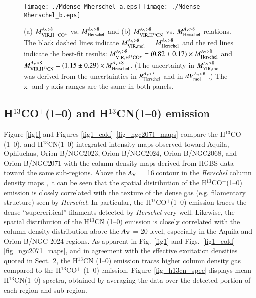 \documentclass{aa}
\begin{document}
\begin{figure}
\begin{center}
\texttt{[image: ./Mdense-Mherschel\_a.eps]} 
\texttt{[image: ./Mdense-Mherschel\_b.eps]} 
\caption{(a) $M_{\rm VIR,H^{13}CO^+}^{A_{\rm V}>8}$ vs. $M_{\rm Herschel}^{A_{\rm V}>8}$ and (b) $M_{\rm VIR,H^{13}CN}^{A_{\rm V}>8}$ vs. $M_{\rm Herschel}^{A_{\rm V}>8}$ relations. The black dashed lines indicate $M_{\rm VIR,mol}^{A_{\rm V}>8}$ = $M_{\rm Herschel}^{A_{\rm V}>8}$ and 
the red lines indicate the best-fit results: 
$M_{\rm VIR,H^{13}CO^+}^{A_{\rm V}>8} = (0.82\pm0.17) \times M_{\rm Herschel}^{A_{\rm V}>8}$ 
and $M_{\rm VIR,H^{13}CN}^{A_{\rm V}>8} = (1.15\pm0.29) \times M_{\rm Herschel}^{A_{\rm V}>8}$. 
(The uncertainty in $M_{\rm VIR,mol}^{A_{\rm V}>8}$ was derived from the uncertainties in $R_{\rm Herschel}^{A_{\rm V}>8}$ and in $dV_{\rm mol}^{A_{\rm V}>8}$ \citep[see][]{Ikeda07, Shimajiri15a}.) {The x- and y-axis ranges are the same in both panels.}}
\label{Fig-Mvir_Mherschel}
\end{center}
\end{figure}





\subsection{H$^{13}$CO$^+$(1--0) and H$^{13}$CN(1--0) emission}

Figure \ref{fig1} and Figures \ref{fig1_cold}--\ref{fig_ngc2071_maps} 
compare  the H$^{13}$CO$^+$(1--0), and H$^{13}$CN(1--0) integrated intensity maps 
observed toward Aquila, Ophiuchus, Orion B/NGC2023, Orion B/NGC2024, Orion B/NGC2068, and Orion B/NGC2071 
with the column density maps derived from HGBS data toward the same sub-regions.
Above the $A_{\rm V}$ = 16 contour in the {\it Herschel} column density maps 
\citep[assuming $N_{\rm H_2}$/$A_{\rm V}$ = 0.94$\times$10$^{21}$cm$^{-2}$,][]{Bohlin78}, 
it can be seen that the spatial distribution of the H$^{13}$CO$^+$(1--0) emission is closely correlated
with the texture of the dense gas (e.g. filamentary structure) seen by {\it Herschel}.
In particular, the H$^{13}$CO$^+$(1--0) emission traces the dense ``supercritical'' filaments detected by {\it Herschel} very well. 
Likewise, the spatial distribution of the H$^{13}$CN (1--0) emission is closely correlated with 
the column density distribution above the $A_{\rm V}$ = 20 level, especially in the Aquila and Orion B/NGC 2024 regions.
As apparent in Fig.~\ref{fig1} and Figs.~\ref{fig1_cold}--\ref{fig_ngc2071_maps}, 
and in agreement with the effective excitation densities quoted in Sect.~2, 
the H$^{13}$CN (1--0) emission traces higher column density gas compared to the H$^{13}$CO$^+$ (1--0) emission. 
Figure~\ref{fig_h13cn_spec} displays mean H$^{13}$CN(1--0) spectra, obtained by averaging the data  
over the detected portion of each region and sub-region. 
\end{document}
